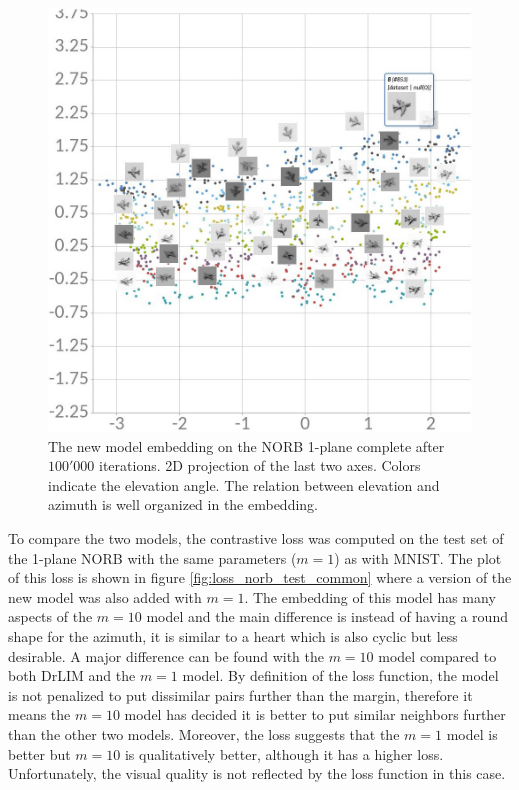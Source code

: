 \documentclass[a4paper,12pt]{report}
\begin{document}
\begin{figure}
    \centering
    \includegraphics[width=\textwidth]{thesis_figures/norb_cl2d2.jpg}
    \caption{The new model embedding on the NORB 1-plane complete after $100'000$ iterations.
    2D projection of the last two axes.
    Colors indicate the elevation angle.
    The relation between elevation and azimuth is well organized in the embedding.
    }
    \label{fig:norb_cl2d_embedding_2}
\end{figure}

To compare the two models, the contrastive loss was computed on the test set of the 1-plane NORB with the same parameters ($m=1$) as with MNIST.
The plot of this loss is shown in figure \ref{fig:loss_norb_test_common} where a version of the new model was also added with $m=1$.
The embedding of this model has many aspects of the $m=10$ model and the main difference is instead of having a round shape for the azimuth, it is similar to a heart which is also cyclic but less desirable.
A major difference can be found with the $m=10$  model compared to both DrLIM and the $m=1$ model.
By definition of the loss function, the model is not penalized to put dissimilar pairs further than the margin, therefore it means the $m=10$ model has decided it is better to put similar neighbors further than the other two models.
Moreover, the loss suggests that the $m=1$ model is better but $m=10$ is qualitatively better, although it has a higher loss.
Unfortunately, the visual quality is not reflected by the loss function in this case.
\end{document}
